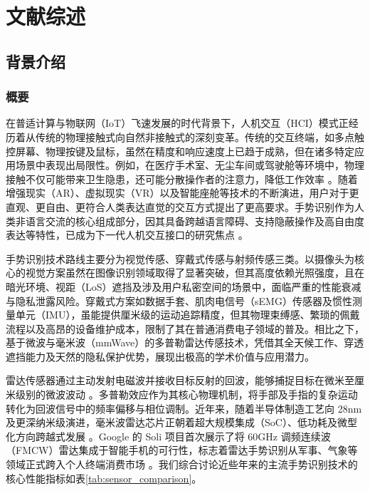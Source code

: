 \cleardoublepage
\section{文献综述}

\subsection{背景介绍}
\subsubsection{概要}
在普适计算与物联网（IoT）飞速发展的时代背景下，人机交互（HCI）模式正经历着从传统的物理接触式向自然非接触式的深刻变革。传统的交互终端，如多点触控屏幕、物理按键及鼠标，虽然在精度和响应速度上已趋于成熟，但在诸多特定应用场景中表现出局限性\cite{6177682}。例如，在医疗手术室、无尘车间或驾驶舱等环境中，物理接触不仅可能带来卫生隐患，还可能分散操作者的注意力，降低工作效率 。随着增强现实（AR）、虚拟现实（VR）以及智能座舱等技术的不断演进，用户对于更直观、更自由、更符合人类表达直觉的交互方式提出了更高要求。手势识别作为人类非语言交流的核心组成部分，因其具备跨越语言障碍、支持隐蔽操作及高自由度表达等特性，已成为下一代人机交互接口的研究焦点\cite{mainpaper} 。

手势识别技术路线主要分为视觉传感、穿戴式传感与射频传感三类。以摄像头为核心的视觉方案虽然在图像识别领域取得了显著突破，但其高度依赖光照强度，且在暗光环境、视距（LoS）遮挡及涉及用户私密空间的场景中，面临严重的性能衰减与隐私泄露风险。穿戴式方案如数据手套、肌肉电信号（sEMG）传感器及惯性测量单元（IMU），虽能提供厘米级的运动追踪精度，但其物理束缚感、繁琐的佩戴流程以及高昂的设备维护成本，限制了其在普通消费电子领域的普及\cite{werable}。相比之下，基于微波与毫米波（mmWave）的多普勒雷达传感技术，凭借其全天候工作、穿透遮挡能力及天然的隐私保护优势，展现出极高的学术价值与应用潜力\cite{soli}。

雷达传感器通过主动发射电磁波并接收目标反射的回波，能够捕捉目标在微米至厘米级别的微波波动 。多普勒效应作为其核心物理机制，将手部及手指的复杂运动转化为回波信号中的频率偏移与相位调制。近年来，随着半导体制造工艺向 28nm 及更深纳米级演进，毫米波雷达芯片正朝着超大规模集成（SoC）、低功耗及微型化方向跨越式发展 。Google 的 Soli 项目首次展示了将 60GHz 调频连续波（FMCW）雷达集成于智能手机的可行性，标志着雷达手势识别从军事、气象等领域正式跨入个人终端消费市场\cite{rs13030527} 。我们综合讨论近些年来的主流手势识别技术的核心性能指标如表\ref{tab:sensor_comparison}。

